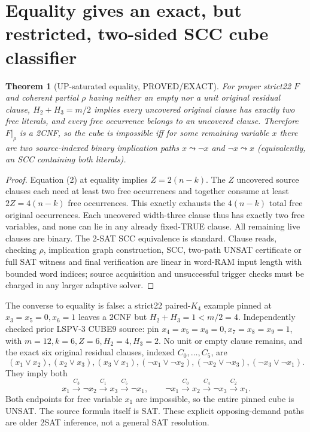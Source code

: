 \documentclass[10pt]{article}
\newtheorem{theorem}{Theorem}
\begin{document}
\section{Equality gives an exact, but restricted, two-sided SCC cube classifier}
\begin{theorem}[UP-saturated equality, PROVED/EXACT]
For proper strict22 $F$ and coherent partial $\rho$ having neither an empty nor a unit original residual clause, $H_2+H_3=m/2$ implies every uncovered original clause has exactly two free literals, and every free occurrence belongs to an uncovered clause. Therefore $F|_\rho$ is a 2CNF, so the cube is impossible iff for some remaining variable $x$ there are two source-indexed binary implication paths $x\leadsto\neg x$ and $\neg x\leadsto x$ (equivalently, an SCC containing both literals).
\end{theorem}
\begin{proof}
Equation (2) at equality implies $Z=2(n-k)$. The $Z$ uncovered source clauses each need at least two free occurrences and together consume at least $2Z=4(n-k)$ free occurrences. This exactly exhausts the $4(n-k)$ total free original occurrences. Each uncovered width-three clause thus has exactly two free variables, and none can lie in any already fixed-TRUE clause. All remaining live clauses are binary. The 2-SAT SCC equivalence is standard. Clause reads, checking $\rho$, implication graph construction, SCC, two-path UNSAT certificate or full SAT witness and final verification are linear in word-RAM input length with bounded word indices; source acquisition and unsuccessful trigger checks must be charged in any larger adaptive solver.
\end{proof}
The converse to equality is false: a strict22 paired-$K_4$ example pinned at $x_3=x_5=0,x_6=1$ leaves a 2CNF but $H_2+H_3=1<m/2=4$.
Independently checked prior LSPV-3 CUBE9 source: pin $x_4=x_5=x_6=0,x_7=x_8=x_9=1$, with $m=12,k=6,Z=6,H_2=4,H_3=2$. No unit or empty clause remains, and the exact six original residual clauses, indexed $C_0,\ldots,C_5$, are
\[
(x_1\vee x_2),(x_2\vee x_3),(x_3\vee x_1),
(\neg x_1\vee\neg x_2),(\neg x_2\vee\neg x_3),(\neg x_3\vee\neg x_1).
\]
They imply both
\[
x_1\xrightarrow{C_3}\neg x_2\xrightarrow{C_1}x_3\xrightarrow{C_5}\neg x_1,\qquad
\neg x_1\xrightarrow{C_0}x_2\xrightarrow{C_4}\neg x_3\xrightarrow{C_2}x_1.
\]
Both endpoints for free variable $x_1$ are impossible, so the entire pinned cube is UNSAT. The source formula itself is SAT. These explicit opposing-demand paths are older 2SAT inference, not a general SAT resolution.
\end{document}

